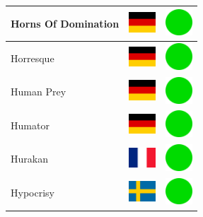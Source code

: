 \documentclass[12pt, a4paper, twoside]{report}
\begin{document}
\begin{center}
\begin{longtable}{|p{5cm}|p{2cm}|p{2cm}|}
Horns Of Domination & \includegraphics[width=1cm]{4x3/de} & \includegraphics[width=1cm]{likes/y} \\ \hline
Horresque & \includegraphics[width=1cm]{4x3/de} & \includegraphics[width=1cm]{likes/y} \\ \hline
Human Prey & \includegraphics[width=1cm]{4x3/de} & \includegraphics[width=1cm]{likes/y} \\ \hline
Humator & \includegraphics[width=1cm]{4x3/de} & \includegraphics[width=1cm]{likes/y} \\ \hline
Hurakan & \includegraphics[width=1cm]{4x3/fr} & \includegraphics[width=1cm]{likes/y} \\ \hline
Hypocrisy & \includegraphics[width=1cm]{4x3/se} & \includegraphics[width=1cm]{likes/y} \\ \hline

\end{longtable}
\end{center}
\end{document}

